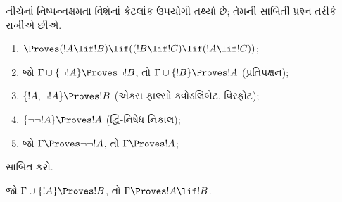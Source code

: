 નીચેનાં નિષ્પન્નક્ષમતા વિશેનાં કેટલાંક ઉપયોગી તથ્યો છે; તેમની
સાબિતી પ્રશ્ન તરીકે રાખીએ છીએ.

\begin{prop}
\begin{enumerate}
\item $\Proves (!A \lif !B) \lif ((!B \lif !C)
  \lif (!A \lif !C))$; 
\item જો $\Gamma \cup \{ \lnot !A\}
  \Proves \lnot !B$, તો $\Gamma \cup \{ !B\} \Proves
  !A$ (પ્રતિપક્ષન); 
\item  $\{ !A, \lnot!A\} \Proves
    !B$ (એક્સ ફાલ્સો ક્વોડલિબેટ, વિસ્ફોટ); 
\item  $\{ \lnot\lnot!A\} \Proves
  !A$ (દ્વિ-નિષેધ નિકાલ);
\item જો $\Gamma \Proves \lnot\lnot!A$, તો $\Gamma \Proves
  !A$;
\end{enumerate}
\end{prop}


\begin{prob}
   સાબિત કરો.
\end{prob}


\endgroup


%
  \begingroup
\makeatletter{}\makeatother


\label{guunit:OLP-0120}


\begin{thm}[નિગમન પ્રમેય]
 જો $\Gamma \cup \{!A\} \Proves !B$,
તો $\Gamma \Proves !A \lif !B$.
\end{thm}

